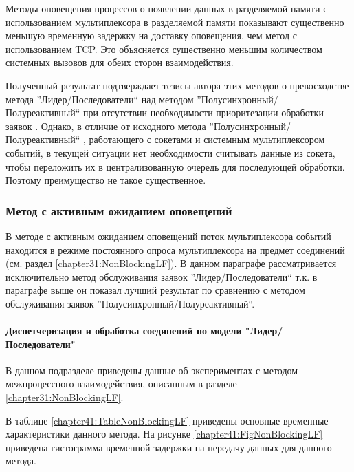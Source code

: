 Методы оповещения процессов о появлении данных в разделяемой памяти с использованием мультиплексора в разделяемой памяти показывают существенно меньшую временную задержку на доставку оповещения, чем метод с использованием TCP. Это объясняется существенно меньшим количеством системных вызовов для обеих сторон взаимодействия.

Полученный результат подтверждает тезисы автора этих методов о превосходстве метода ''Лидер/Последователи`` над методом ''Полусинхронный/Полуреактивный`` при отсутствии необходимости приоритезации обработки заявок \cite[398]{schmidt2013pattern}. Однако, в отличие от исходного метода ''Полусинхронный/Полуреактивный`` \cite[375]{schmidt2013pattern}, работающего с сокетами и системным мультиплексором событий, в текущей ситуации нет необходимости считывать данные из сокета, чтобы переложить их в централизованную очередь для последующей обработки. Поэтому преимущество не такое существенное.

\subsubsection{Метод с активным ожиданием оповещений}

В методе с активным ожиданием оповещений поток мультиплексора событий находится в режиме постоянного опроса мультиплексора на предмет соединений (см. раздел \ref{chapter31:NonBlockingLF}). В данном параграфе рассматривается исключительно метод обслуживания заявок ''Лидер/Последователи`` т.к. в параграфе выше он показал лучший результат по сравнению с методом обслуживания заявок ''Полусинхронный/Полуреактивный``.

\paragraph{Диспетчеризация и обработка соединений по модели "Лидер/Последователи"}

В данном подразделе приведены данные об экспериментах с методом межпроцессного взаимодействия, описанным в разделе \ref{chapter31:NonBlockingLF}.

В таблице \ref{chapter41:TableNonBlockingLF} приведены основные временные характеристики данного метода. На рисунке \ref{chapter41:FigNonBlockingLF} приведена гистограмма временной задержки на передачу данных для данного метода.

